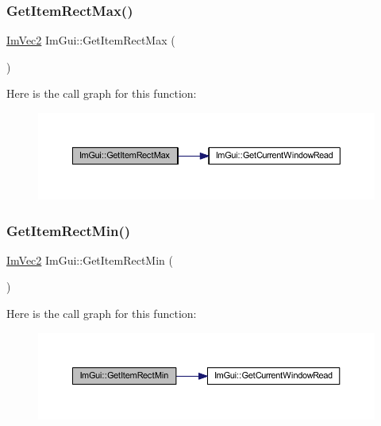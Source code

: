 \subsubsection{\texorpdfstring{Get\+Item\+Rect\+Max()}{GetItemRectMax()}}
{\footnotesize\ttfamily \mbox{\hyperlink{struct_im_vec2}{Im\+Vec2}} Im\+Gui\+::\+Get\+Item\+Rect\+Max (\begin{DoxyParamCaption}{ }\end{DoxyParamCaption})}

Here is the call graph for this function\+:
\nopagebreak
\begin{figure}[H]
\begin{center}
\leavevmode
\includegraphics[width=350pt]{namespace_im_gui_a3d260209b8dc25a2c942e8cfd1ed0e51_cgraph}
\end{center}
\end{figure}
\mbox{\label{namespace_im_gui_a65b24b72ec0e8444c705cebf3e91f570}} 
\subsubsection{\texorpdfstring{Get\+Item\+Rect\+Min()}{GetItemRectMin()}}
{\footnotesize\ttfamily \mbox{\hyperlink{struct_im_vec2}{Im\+Vec2}} Im\+Gui\+::\+Get\+Item\+Rect\+Min (\begin{DoxyParamCaption}{ }\end{DoxyParamCaption})}

Here is the call graph for this function\+:
\nopagebreak
\begin{figure}[H]
\begin{center}
\leavevmode
\includegraphics[width=350pt]{namespace_im_gui_a65b24b72ec0e8444c705cebf3e91f570_cgraph}
\end{center}
\end{figure}
\mbox{\label{namespace_im_gui_a3303d1c37041307e11fd46fc43b2274d}} 
